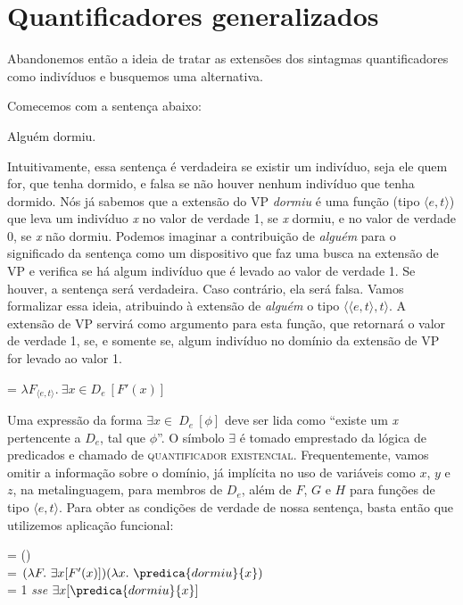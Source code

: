 \section{Quantificadores generalizados}

Abandonemos então a ideia de tratar as extensões dos sintagmas
quantificadores como indivíduos e busquemos uma alternativa.

Comecemos com a sentença abaixo:

\begin{exe}
    \ex Alguém dormiu. \label{all}
\end{exe}

Intuitivamente, essa sentença é verdadeira se existir um
indivíduo, seja ele quem for, que tenha dormido, e falsa se não
houver nenhum indivíduo que tenha dormido. Nós já sabemos que a extensão do VP
\textit{dormiu} é uma função (tipo $\langle e,t\rangle$) que leva um
indivíduo \textit{x} no valor de verdade 1, se \textit{x} dormiu, e
no valor de verdade 0, se \textit{x} não dormiu. Podemos imaginar
a contribuição de \textit{alguém} para o significado da sentença como um
dispositivo que faz uma busca na extensão de VP e verifica se há
algum indivíduo que é levado ao valor de verdade 1. Se houver, a
sentença será verdadeira. Caso contrário, ela será falsa. Vamos
formalizar essa ideia, atribuindo à extensão de \textit{alguém} o tipo
$\langle\langle e,t\rangle,t\rangle$. A extensão de VP servirá
como argumento para esta função, que retornará o valor de verdade
1, se, e somente se, algum indivíduo no domínio da extensão de VP
for levado ao valor 1.

\begin{exe}
	\ex {} = $\lambda F_{\langle e,t\rangle}.\ \exists \textit{x} \in D_{e}\ [F'(x)]$
\end{exe}

\n Uma expressão da forma \underline{$\exists \textit{x} \in\ D_{e}\ [\phi]$} deve ser lida como ``existe um \textit{x} pertencente a $D_{e}$, tal que $\phi$''. O símbolo $\exists$ é tomado emprestado da lógica de predicados e chamado de \textsc{quantificador existencial}. Frequentemente, vamos omitir a informação sobre o domínio, já implícita no uso de variáveis como $x$, $y$ e $z$, na metalinguagem, para membros de $D_{e}$, além de $F$, $G$ e $H$ para funções de tipo $\langle e,t\rangle$. Para obter as condições de verdade de nossa sentença, basta
então que utilizemos aplicação funcional:

\begin{exe}
	\ex {} = ()\\
	= $(\lambda F.\ \exists x[F'(x)])(\lambda x.\ \predica{dormiu}{x})$\\
	= 1 \textit{sse} $\exists x[\predica{dormiu}{x}]$
\end{exe}

